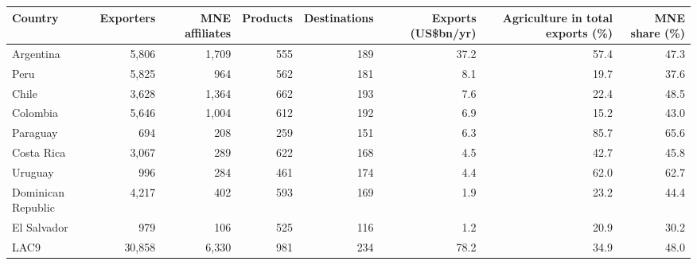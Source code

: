 \begin{tabular}{lrrrrrrr}
\toprule
Country & Exporters & MNE affiliates & Products & Destinations & Exports (US\$bn/yr) & Agriculture in total exports (\%) & MNE share (\%) \\
\midrule
Argentina & 5,806 & 1,709 & 555 & 189 & 37.2 & 57.4 & 47.3 \\
Peru & 5,825 & 964 & 562 & 181 & 8.1 & 19.7 & 37.6 \\
Chile & 3,628 & 1,364 & 662 & 193 & 7.6 & 22.4 & 48.5 \\
Colombia & 5,646 & 1,004 & 612 & 192 & 6.9 & 15.2 & 43.0 \\
Paraguay & 694 & 208 & 259 & 151 & 6.3 & 85.7 & 65.6 \\
Costa Rica & 3,067 & 289 & 622 & 168 & 4.5 & 42.7 & 45.8 \\
Uruguay & 996 & 284 & 461 & 174 & 4.4 & 62.0 & 62.7 \\
Dominican Republic & 4,217 & 402 & 593 & 169 & 1.9 & 23.2 & 44.4 \\
El Salvador & 979 & 106 & 525 & 116 & 1.2 & 20.9 & 30.2 \\
\midrule
LAC9 & 30,858 & 6,330 & 981 & 234 & 78.2 & 34.9 & 48.0 \\
\bottomrule
\end{tabular}
